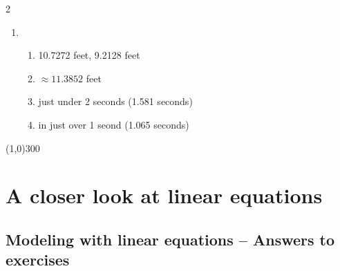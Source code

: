 \begin{multicols} {2}
\begin{enumerate}
\item %
\begin{enumerate}
\item 10.7272 feet, 9.2128 feet
\item $\approx 11.3852$ feet
\item just under 2 seconds (1.581 seconds)
\item in just over 1 seond (1.065 seconds)
\end{enumerate}

\end{enumerate}
\end{multicols}

\begin{center}
\line(1,0){300} %
\end{center}


\section{A closer look at linear equations} %

\bigskip

\subsection {Modeling with linear equations -- Answers to exercises} %

